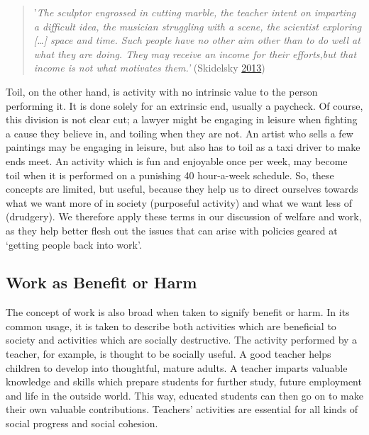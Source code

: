 \documentclass[]{tufte-handout}
\begin{document}
\begin{quote}
'\emph{The sculptor engrossed in cutting marble, the teacher intent on
imparting a difficult idea, the musician struggling with a scene, the
scientist exploring {[}\ldots{}{]} space and time. Such people have no
other aim other than to do well at what they are doing. They may receive
an income for their efforts,but that income is not what motivates
them.'} (Skidelsky \protect\hyperlink{ref-Skidelsky2013}{2013})
\end{quote}

Toil, on the other hand, is activity with no intrinsic value to the
person performing it. It is done solely for an extrinsic end, usually a
paycheck. Of course, this division is not clear cut; a lawyer might be
engaging in leisure when fighting a cause they believe in, and toiling
when they are not. An artist who sells a few paintings may be engaging
in leisure, but also has to toil as a taxi driver to make ends meet. An
activity which is fun and enjoyable once per week, may become toil when
it is performed on a punishing 40 hour-a-week schedule. So, these
concepts are limited, but useful, because they help us to direct
ourselves towards what we want more of in society (purposeful activity)
and what we want less of (drudgery). We therefore apply these terms in
our discussion of welfare and work, as they help better flesh out the
issues that can arise with policies geared at `getting people back into
work'.

\hypertarget{work-as-benefit-or-harm}{%
\subsection{Work as Benefit or Harm}\label{work-as-benefit-or-harm}}

The concept of work is also broad when taken to signify benefit or harm.
In its common usage, it is taken to describe both activities which are
beneficial to society and activities which are socially destructive. The
activity performed by a teacher, for example, is thought to be socially
useful. A good teacher helps children to develop into thoughtful, mature
adults. A teacher imparts valuable knowledge and skills which prepare
students for further study, future employment and life in the outside
world. This way, educated students can then go on to make their own
valuable contributions. Teachers' activities are essential for all kinds
of social progress and social cohesion.
\end{document}

